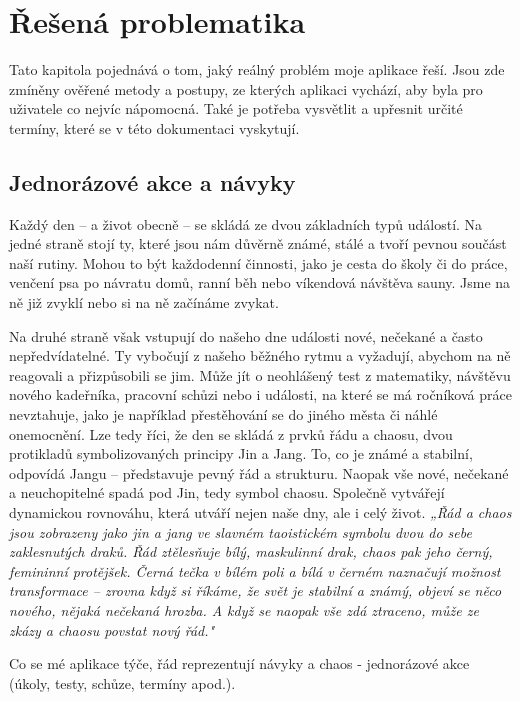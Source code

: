 \chapter{Řešená problematika}
\hspace{14pt} Tato kapitola pojednává o tom, jaký reálný problém moje aplikace řeší. Jsou zde zmíněny ověřené metody a postupy, ze kterých aplikaci vychází, aby byla pro uživatele co nejvíc nápomocná. Také je potřeba vysvětlit a upřesnit určité termíny, které se v této dokumentaci vyskytují.
\section{Jednorázové akce a návyky}
\hspace{14pt} Každý den – a život obecně – se skládá ze dvou základních typů událostí. Na jedné straně stojí ty, které jsou nám důvěrně známé, stálé a tvoří pevnou součást naší rutiny. Mohou to být každodenní činnosti, jako je cesta do školy či do práce, venčení psa po návratu domů, ranní běh nebo víkendová návštěva sauny. Jsme na ně již zvyklí nebo si na ně začínáme zvykat.

Na druhé straně však vstupují do našeho dne události nové, nečekané a často nepředvídatelné. Ty vybočují z našeho běžného rytmu a vyžadují, abychom na ně reagovali a přizpůsobili se jim. Může jít o neohlášený test z matematiky, návštěvu nového kadeřníka, pracovní schůzi nebo i události, na které se má ročníková práce nevztahuje, jako je například přestěhování se do jiného města či náhlé onemocnění.  
Lze tedy říci, že den se skládá z prvků řádu a chaosu, dvou protikladů symbolizovaných principy Jin a Jang. To, co je známé a stabilní, odpovídá Jangu – představuje pevný řád a strukturu. Naopak vše nové, nečekané a neuchopitelné spadá pod Jin, tedy symbol chaosu. Společně vytvářejí dynamickou rovnováhu, která utváří nejen naše dny, ale i celý život. \textit{„Řád a chaos jsou zobrazeny jako jin a jang ve slavném taoistickém symbolu dvou do sebe zaklesnutých draků. Řád ztělesňuje bílý, maskulinní drak, chaos pak jeho černý, femininní protějšek. Černá tečka v bílém poli a bílá v černém naznačují možnost transformace – zrovna když si říkáme, že svět je stabilní a známý, objeví se něco nového, nějaká nečekaná hrozba. A když se naopak vše zdá ztraceno, může ze zkázy a chaosu povstat nový řád."}\cite{peterson2025} 

\newpage

Co se mé aplikace týče, řád reprezentují návyky a chaos - jednorázové akce (úkoly, testy, schůze, termíny apod.).
